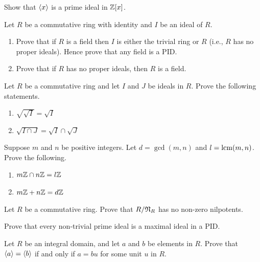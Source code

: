\begin{problem}
    Show that $\left\langle x\right\rangle$ is a prime ideal in $\mathbb{Z}[x]$.
\end{problem}

\begin{problem}\label{problem-ring-is-field-iff-no-proper-ideals}
    Let $R$ be a commutative ring with identity and $I$ be an ideal of $R$.
    \begin{enumerate}[label=(\alph*)]
        \item Prove that if $R$ is a field then $I$ is either the trivial ring or $R$ (i.e., $R$ has no proper ideals). Hence prove that any field is a PID.
        \item Prove that if $R$ has no proper ideals, then $R$ is a field.
    \end{enumerate}
\end{problem}

\begin{problem}
    Let $R$ be a commutative ring and let $I$ and $J$ be ideals in $R$. Prove the following statements.
    \begin{enumerate}[label=(\alph*)]
        \item $\sqrt{\sqrt{I}} = \sqrt{I}$
        \item $\sqrt{I \cap J} = \sqrt{I} \cap \sqrt{J}$
    \end{enumerate}
\end{problem}

\begin{problem}
    Suppose $m$ and $n$ be positive integers. Let $d = \gcd(m,n)$ and $l = \mathrm{lcm}(m,n)$. Prove the following.
    \begin{enumerate}[label=(\alph*)]
        \item $m\mathbb{Z} \cap n\mathbb{Z} = l\mathbb{Z}$
        \item $m\mathbb{Z} + n\mathbb{Z} = d\mathbb{Z}$
    \end{enumerate}
\end{problem}

\begin{problem}
    Let $R$ be a commutative ring. Prove that $R / \mathfrak{N}_{R}$ has no non-zero nilpotents.
\end{problem}

\begin{problem}
    Prove that every non-trivial prime ideal is a maximal ideal in a PID.
\end{problem}

\begin{problem}
    Let $R$ be an integral domain, and let $a$ and $b$ be elements in $R$. Prove that $\left\langle a\right\rangle = \left\langle b\right\rangle$ if and only if $a = bu$ for some unit $u$ in $R$.
\end{problem}

